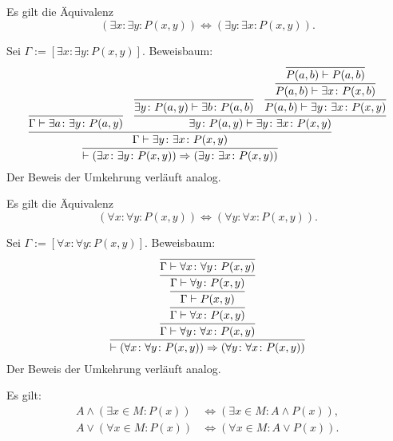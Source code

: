 \begin{Satz}[Kommutativgesetz]\label{exists-cl}
Es gilt die Äquivalenz
\[(\exists x\colon\exists y\colon P(x,y)) \iff (\exists y\colon\exists x\colon P(x,y)).\]
\end{Satz}
\begin{Beweis}[Beweis]
Sei $\Gamma:=[\exists x\colon\exists y\colon P(x,y)]$.
Beweisbaum:
\[
\infer{\vdash(\exists x\colon\exists y\colon P(x,y))
  \Rightarrow (\exists y\colon\exists x\colon P(x,y))
}{
  \infer{\Gamma\vdash\exists y\colon\exists x\colon P(x,y)}{
    \infer{\Gamma\vdash\exists a\colon\exists y\colon P(a,y)}{}
  & \infer{\exists y\colon P(a,y)\vdash\exists y\colon\exists x\colon P(x,y)}{
      \infer{\exists y\colon P(a,y)\vdash\exists b\colon P(a,b)}{}
    & \infer{P(a,b)\vdash\exists y\colon\exists x\colon P(x,y)}{
        \infer{P(a,b)\vdash\exists x\colon P(x,b)}{
          \infer{P(a,b)\vdash P(a,b)}{}}}}}}
\]
Der Beweis der Umkehrung verläuft analog.\,\qedsymbol
\end{Beweis}

\begin{Satz}[Kommutativgesetz]\label{all-cl}
Es gilt die Äquivalenz
\[(\forall x\colon\forall y\colon P(x,y))
\iff (\forall y\colon\forall x\colon P(x,y)).\]
\end{Satz}
\begin{Beweis}[Beweis]
Sei $\Gamma:=[\forall x\colon\forall y\colon P(x,y)]$.
Beweisbaum:
\[
\infer{\vdash (\forall x\colon\forall y\colon P(x,y))
  \Rightarrow (\forall y\colon\forall x\colon P(x,y))
}{
  \infer{\Gamma\vdash\forall y\colon\forall x\colon P(x,y)}{
    \infer{\Gamma\vdash\forall x\colon P(x,y)}{
      \infer{\Gamma\vdash P(x,y)}{
        \infer{\Gamma\vdash\forall y\colon P(x,y)}{
          \infer{\Gamma\vdash\forall x\colon\forall y\colon P(x,y)}{}}}}}}
\]
Der Beweis der Umkehrung verläuft analog.\,\qedsymbol
\end{Beweis}

\begin{Satz}%
\label{bounded-general-dl}
Es gilt:
\begin{align*}
A\land (\exists x{\in}M\colon P(x)) &\iff (\exists x{\in}M\colon A\land P(x)),\\
A\lor (\forall x{\in}M\colon P(x)) &\iff (\forall x{\in}M\colon A\lor P(x)).
\end{align*}
\end{Satz}

